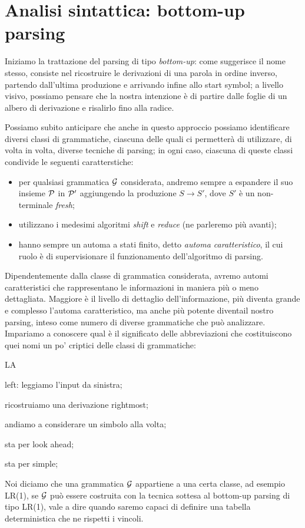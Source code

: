 \documentclass[class=book, crop=false, oneside, 12pt]{standalone}
\begin{document}
\chapter{Analisi sintattica: bottom-up parsing}
Iniziamo la trattazione del parsing di tipo \emph{bottom-up}: come suggerisce il nome stesso, consiste nel ricostruire le derivazioni di una parola in ordine inverso, partendo dall'ultima produzione e arrivando infine allo start symbol; a livello visivo, possiamo pensare che la nostra intenzione è di partire dalle foglie di un albero di derivazione e risalirlo fino alla radice.

Possiamo subito anticipare che anche in questo approccio possiamo identificare diversi classi di grammatiche, ciascuna delle quali ci permetterà di utilizzare, di volta in volta, diverse tecniche di parsing; in ogni caso, ciascuna di queste classi condivide le seguenti caratterstiche:
\begin{itemize}
    \item per qualsiasi grammatica \(\G\) considerata, andremo sempre a espandere il suo insieme \(\P\) in \(\P'\) aggiungendo la produzione \(S \to S'\), dove \(S'\) è un non-terminale \emph{fresh};
    \item utilizzano i medesimi algoritmi \emph{shift} e \emph{reduce} (ne parleremo più avanti);
    \item hanno sempre un automa a stati finito, detto \emph{automa caratteristico}, il cui ruolo è di supervisionare il funzionamento dell'algoritmo di parsing.
\end{itemize}
Dipendentemente dalla classe di grammatica considerata, avremo automi caratteristici che rappresentano le informazioni in maniera più o meno dettagliata. Maggiore è il livello di dettaglio dell'informazione, più diventa grande e complesso l'automa caratteristico, ma anche più potente diventail nostro parsing, inteso come numero di diverse grammatiche che può analizzare. Impariamo a conoscere qual è il significato delle abbreviazioni che costituiscono quei nomi un po' criptici delle classi di grammatiche:
\begin{labeling}{LA}
    \item[L] left: leggiamo l'input da sinistra;
    \item[R] ricostruiamo una derivazione rightmost;
    \item[1] andiamo a considerare un simbolo alla volta;
    \item[LA] sta per look ahead;
    \item[S] sta per simple;  
\end{labeling}
Noi diciamo che una grammatica \(\G\) appartiene a una certa classe, ad esempio LR(1), se \(\G\) può essere costruita con la tecnica sottesa al bottom-up parsing di tipo LR(1), vale a dire quando saremo capaci di definire una tabella deterministica che ne rispetti i vincoli.
\end{document}

